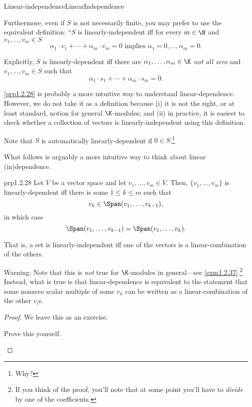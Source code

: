 \begin{dfn}{Linear-independence}{LinearIndependence}
\begin{rmk}
		Furthermore, even if $S$ is not necessarily finite, you may prefer to use the equivalent definition:  ``$S$ is linearly-independent iff for every $m\in \N$ and $v_1,\ldots ,v_m\in S$
		\begin{equation}
			\alpha _1\cdot v_1+\cdots +\alpha _m\cdot v_m=0\text{ implies }\alpha _1=0,\ldots ,\alpha _m=0.
		\end{equation}
	\end{rmk}
	\begin{rmk}
		Explicitly, $S$ is linearly-dependent iff there are $\alpha _1,\ldots ,\alpha _m\in \K$ \emph{not all zero} and $v_1,\ldots ,v_m\in S$ such that
		\begin{equation}
			\alpha _1\cdot s_1+\cdots +\alpha _m\cdot s_m=0.
		\end{equation}
	\end{rmk}
	\begin{rmk}
		\cref{prp1.2.28} is probably a more intuitive way to understand linear-dependence.  However, we do not take it as a definition because (i) it is not the right, or at least standard, notion for general $\K$-modules; and (ii) in practice, it is easiest to check whether a collection of vectors is linearly-independent using this definition.
	\end{rmk}
	\begin{rmk}
		Note that $S$ is automatically linearly-dependent if $0\in S$.\footnote{Why?}
	\end{rmk}
\end{dfn}
What follows is arguably a more intuitive way to think about linear (in)dependence.
\begin{prp}{}{prp1.2.28}
	Let $V$ be a vector space and let $v_1,\ldots ,v_m\in V$.  Then, $\{ v_1,\ldots ,v_m\}$ is linearly-dependent iff there is some $1\leq k\leq m$ such that
	\begin{equation}
		v_k\in \Span (v_1,\ldots ,v_{k-1}),
	\end{equation}
	in which case
	\begin{equation}
		\Span (v_1,\ldots ,v_{k-1})=\Span (v_1,\ldots ,v_k).
	\end{equation}
	\begin{rmk}
		That is, a set is linearly-independent iff one of the vectors is a linear-combination of the others.
	\end{rmk}
	\begin{rmk}
		Warning:  Note that this is \emph{not} true for $\K$-modules in general---see \cref{exm1.2.37}.\footnote{If you think of the proof, you'll note that at some point you'll have to \emph{divide} by one of the coefficients.}  Instead, what is true is that linear-dependence is equivalent to the statement that some nonzero scalar multiple of some $v_k$ can be written as a linear-combination of the other $v_i$s.
	\end{rmk}
	\begin{proof}
		We leave this as an exercise.
		\begin{exr}[breakable=false]{}{}
			Prove this yourself.
		\end{exr}
	\end{proof}
\end{prp}

